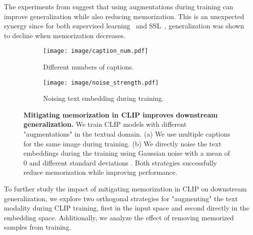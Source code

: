 The experiments from  suggest that using augmentations during training can improve generalization while also reducing memorization.
This is an unexpected synergy since for both supervised learning~\citep{feldman2020does} and SSL~\citep{wang2024memorization}, generalization was shown to decline when memorization decreases.
\begin{figure}[t]
\begin{subfigure}{0.48\columnwidth}
        \centering
    \texttt{[image: image/caption\_num.pdf]}
    \caption{Different numbers of captions.}
    \label{fig:num_captions}
\end{subfigure}
\hfill
\begin{subfigure}{0.48\columnwidth}
\centering
\texttt{[image: image/noise\_strength.pdf]}
        \caption{Noising text embedding during training.}
    \label{fig:noising}
\end{subfigure}
    \caption{\textbf{Mitigating memorization in CLIP improves downstream generalization.} We train CLIP models with different "augmentations" in the textual domain. (a) We use multiple captions for the same image during training. (b) We directly noise the text embeddings during the training using Gaussian noise with a mean of 0 and different standard deviations . Both strategies successfully reduce memorization while improving performance.}
    \label{fig:mitigations}
\end{figure}
To further study the impact of mitigating memorization in CLIP on downstream generalization, we explore two orthogonal strategies for "augmenting" the text modality during CLIP training, first in the input space and second directly in the embedding space. Additionally, we analyze the effect of removing memorized samples from training.

